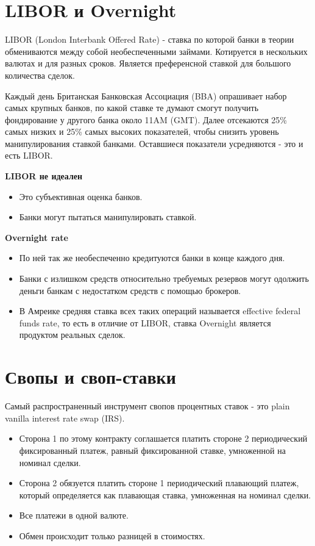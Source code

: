 \documentclass{article}
\begin{document}
\section{LIBOR и Overnight}

LIBOR (London Interbank Offered Rate) - ставка по которой банки в теории обмениваются между собой необеспеченными займами. Котируется в нескольких валютах и для разных сроков. Является преференсной ставкой для большого количества сделок.

Каждый день Британская Банковская Ассоциация (BBA) опрашивает набор самых крупных банков, по какой ставке те думают смогут получить фондирование у другого банка около 11AM (GMT). Далее отсекаются 25\% самых низких и 25\% самых высоких показателей, чтобы снизить уровень манипулирования ставкой банками. Оставшиеся показатели усредняются - это и есть LIBOR.

\textbf{LIBOR не идеален}
\begin{itemize}
    \item Это субъективная оценка банков.
    \item Банки могут пытаться манипулировать ставкой.
\end{itemize}

\textbf{Overnight rate}
\begin{itemize}
    \item По ней так же необеспеченно кредитуются банки в конце каждого дня.
    \item Банки с излишком средств относительно требуемых резервов могут одолжить деньги банкам с недостатком средств с помощью брокеров.
    \item В Амреике средняя ставка всех таких операций называется effective federal funds rate, то есть в отличие от LIBOR, ставка Overnight является продуктом реальных сделок.
\end{itemize}

\section{Свопы и своп-ставки}

Самый распространенный инструмент свопов процентных ставок - это plain vanilla interest rate swap (IRS).
\begin{itemize}
    \item Сторона 1 по этому контракту соглашается платить стороне 2 периодический фиксированный платеж, равный фиксированной ставке, умноженной на номинал сделки.

    \item Сторона 2 обязуется платить стороне 1 периодический плавающий платеж, который определяется как плавающая ставка, умноженная на номинал сделки.

    \item Все платежи в одной валюте.

    \item Обмен происходит только разницей в стоимостях.
\end{itemize}
\end{document}
